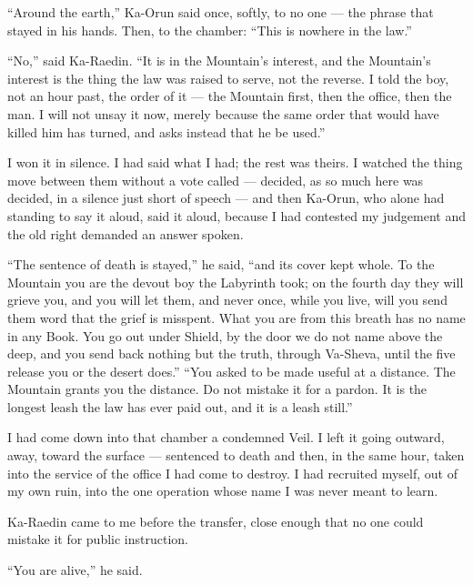 ``Around the earth,'' Ka-Orun said once, softly, to no one --- the phrase that stayed in his hands. Then, to the chamber: ``This is nowhere in the law.''\par

``No,'' said Ka-Raedin. ``It is in the Mountain's interest, and the Mountain's interest is the thing the law was raised to serve, not the reverse. I told the boy, not an hour past, the order of it --- the Mountain first, then the office, then the man. I will not unsay it now, merely because the same order that would have killed him has turned, and asks instead that he be used.''\par

I won it in silence. I had said what I had; the rest was theirs. I watched the thing move between them without a vote called --- decided, as so much here was decided, in a silence just short of speech --- and then Ka-Orun, who alone had standing to say it aloud, said it aloud, because I had contested my judgement and the old right demanded an answer spoken.\par

``The sentence of death is stayed,'' he said, ``and its cover kept whole. To the Mountain you are the devout boy the Labyrinth took; on the fourth day they will grieve you, and you will let them, and never once, while you live, will you send them word that the grief is misspent. What you are from this breath has no name in any Book. You go out under Shield, by the door we do not name above the deep, and you send back nothing but the truth, through Va-Sheva, until the five release you or the desert does.'' ``You asked to be made useful at a distance. The Mountain grants you the distance. Do not mistake it for a pardon. It is the longest leash the law has ever paid out, and it is a leash still.''\par

\ornament

I had come down into that chamber a condemned Veil. I left it going outward, away, toward the surface --- sentenced to death and then, in the same hour, taken into the service of the office I had come to destroy. I had recruited myself, out of my own ruin, into the one operation whose name I was never meant to learn.\par

Ka-Raedin came to me before the transfer, close enough that no one could mistake it for public instruction.\par

``You are alive,'' he said.\par

